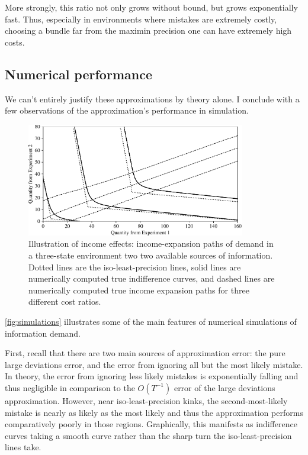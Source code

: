 \documentclass{fancyArticle}
\renewcommand{\|}{\,|\,}                    %
\providecommand{\;}{\,;}                    %
\begin{document}
More strongly, this ratio not only grows without bound, but grows exponentially fast.
Thus, especially in environments where mistakes are extremely costly, choosing a bundle far from the maximin precision one can have extremely high costs.

\subsection{Numerical performance}
\label{sec:simulations}

We can't entirely justify these approximations by theory alone.
I conclude with a few observations of the approximation's performance in simulation.

\begin{figure}[t]
  \centering
 \includegraphics[width=0.85\textwidth]{figures/poissonincexp.pdf}
 \caption{%
   Illustration of income effects: income-expansion paths of demand in a three-state environment two two available sources of information.
   Dotted lines are the iso-least-precision lines, solid lines are numerically computed true indifference curves, and dashed lines are numerically computed true income expansion paths for three different cost ratios.
 }
  \label{fig:simulations}
\end{figure}

\autoref{fig:simulations} illustrates some of the main features of numerical simulations of information demand.\footnotemark
{}

First, recall that there are two main sources of approximation error: the pure large deviations error, and the error from ignoring all but the most likely mistake.
In theory, the error from ignoring less likely mistakes is exponentially falling and thus negligible in comparison to the $O(T^{-1})$ error of the large deviations approximation.
However, near iso-least-precision kinks, the second-most-likely mistake is nearly as likely as the most likely and thus the approximation performs comparatively poorly in those regions.\footnotemark
{}
Graphically, this manifests as indifference curves taking a smooth curve rather than the sharp turn the iso-least-precision lines take.
\end{document}
